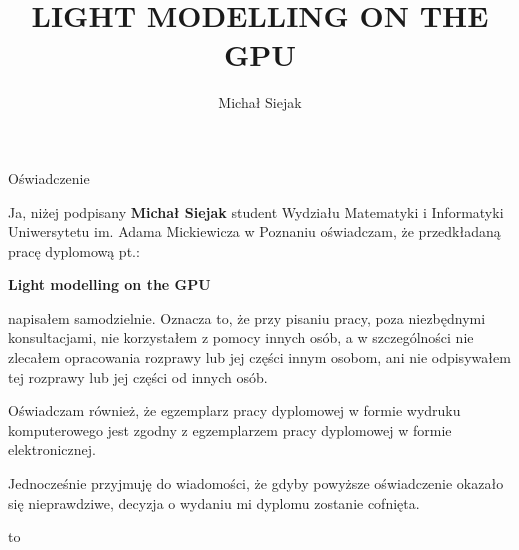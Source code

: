 \documentclass[twoside,openright,a4paper,12pt]{memoir}
\theoremstyle{definition}
\begin{document}
\title{LIGHT MODELLING ON THE GPU}
\author{Michał Siejak}

\frontmatter
{}
\maketitle
\newpage
{}
\setcounter{page}{2}

\begin{center}
  \LARGE{Oświadczenie}
\end{center}

Ja, niżej podpisany \textbf{Michał Siejak} student Wydziału
Matematyki i Informatyki Uniwersytetu im. Adama Mickiewicza w Poznaniu
oświadczam, że przedkładaną pracę dyplomową pt.:

\centerline{\textbf{Light modelling on the GPU}}

napisałem samodzielnie. Oznacza to, że przy pisaniu pracy, poza niezbędnymi
konsultacjami, nie korzystałem z pomocy innych osób, a w szczególności nie
zlecałem opracowania rozprawy lub jej części innym osobom, ani nie
odpisywałem tej rozprawy lub jej części od innych osób.

Oświadczam również, że egzemplarz pracy dyplomowej w formie wydruku
komputerowego jest zgodny z egzemplarzem pracy dyplomowej w formie
elektronicznej.

Jednocześnie przyjmuję do wiadomości, że gdyby powyższe oświadczenie
okazało się nieprawdziwe, decyzja o wydaniu mi dyplomu zostanie cofnięta.

\newcommand{\kropki}[2]{%
  \vbox{%
    \hbox to #1{\dotfill}%
    \vspace{4pt}%
    \hbox to #1{\hss #2\hss}%
  }
}
\vspace{1cm}
\hbox to \textwidth{%
  \hfil
  \kropki{4cm}{data}%
  \hfil\hfil
  \kropki{4cm}{podpis}%
  \hfil
}
\newpage

\begingroup
\setlength{\beforechapskip}{0pt}
\tableofcontents*
\endgroup

\mainmatter

%


%



\backmatter
\printbibliography
\end{document}
